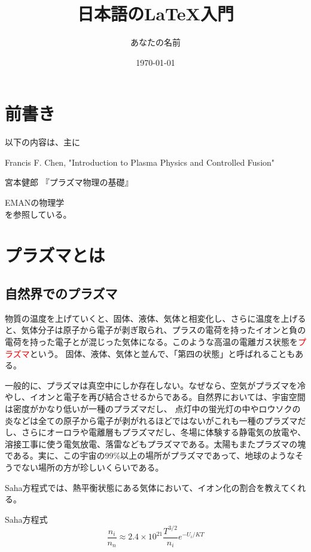 \documentclass{ltjsarticle}
\title{日本語のLaTeX入門}
\author{あなたの名前}
\date{\today}
\numberwithin{equation}{section} %
\begin{document}
\maketitle

\tableofcontents

\section*{前書き}
 以下の内容は、主に

\cite{a} Francis F. Chen, "Introduction to Plasma Physics and Controlled Fusion"\par
\cite{b} 宮本健郎 『プラズマ物理の基礎』\par
\cite{c} EMANの物理学\\
を参照している。





\section{プラズマとは}
\subsection{自然界でのプラズマ}
 物質の温度を上げていくと、固体、液体、気体と相変化し、さらに温度を上げると、気体分子は原子から電子が剥ぎ取られ、プラスの電荷を持ったイオンと負の電荷を持った電子とが混じった気体になる。このような高温の電離ガス状態を\textcolor{red}{プラズマ}という。
固体、液体、気体と並んで、「第四の状態」と呼ばれることもある。

 一般的に、プラズマは真空中にしか存在しない。なぜなら、空気がプラズマを冷やし、イオンと電子を再び結合させるからである。自然界においては、宇宙空間は密度がかなり低いが一種のプラズマだし、
点灯中の蛍光灯の中やロウソクの炎などは全ての原子から電子が剥がれるほどではないがこれも一種のプラズマだし、さらにオーロラや電離層もプラズマだし、冬場に体験する静電気の放電や、溶接工事に使う電気放電、落雷などもプラズマである。太陽もまたプラズマの塊である。実に、この宇宙の99\%以上の場所がプラズマであって、地球のようなそうでない場所の方が珍しいくらいである。

 Saha方程式では、熱平衡状態にある気体において、イオン化の割合を教えてくれる。

\begin{eqbox}{Saha方程式}
\begin{equation}
\frac{n_i}{n_n} \approx 2.4 \times 10^{21} \frac{T^{3/2}}{n_i} e^{-U_i/KT} 
\end{equation}  
\end{eqbox}
\end{document}
